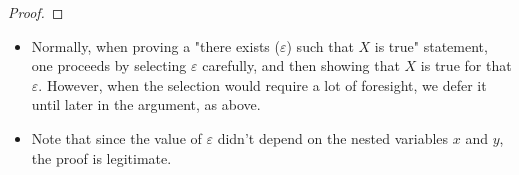 \documentclass[../main.tex]{subfiles}
\begin{document}
\begin{itemize}
\begin{prop}
\begin{proof}
        \end{proof}
    \end{prop}
    \begin{itemize}
        \item Normally, when proving a "there exists ($\varepsilon$) such that $X$ is true" statement, one proceeds by selecting $\varepsilon$ carefully, and then showing that $X$ is true for that $\varepsilon$. However, when the selection would require a lot of foresight, we defer it until later in the argument, as above.
        \item Note that since the value of $\varepsilon$ didn't depend on the nested variables $x$ and $y$, the proof is legitimate.
    \end{itemize}
\end{itemize}
\end{document}
